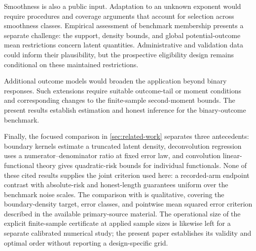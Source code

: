 Smoothness is also a public input. Adaptation to an unknown exponent would require procedures and coverage arguments that account for selection across smoothness classes. Empirical assessment of benchmark membership presents a separate challenge: the support, density bounds, and global potential-outcome mean restrictions concern latent quantities. Administrative and validation data could inform their plausibility, but the prospective eligibility design remains conditional on these maintained restrictions.

Additional outcome models would broaden the application beyond binary responses. Such extensions require suitable outcome-tail or moment conditions and corresponding changes to the finite-sample second-moment bounds. The present results establish estimation and honest inference for the binary-outcome benchmark.

Finally, the focused comparison in \cref{sec:related-work} separates three antecedents: boundary kernels estimate a truncated latent density, deconvolution regression uses a numerator--denominator ratio at fixed error law, and convolution linear-functional theory gives quadratic-risk bounds for individual functionals. None of these cited results supplies the joint criterion used here: a recorded-arm endpoint contrast with absolute-risk and honest-length guarantees uniform over the benchmark noise scales. The comparison with \citet{ZhangKarunamuni2009Boundary} is qualitative, covering the boundary-density target, error classes, and pointwise mean squared error criterion described in the available primary-source material. The operational size of the explicit finite-sample certificate at applied sample sizes is likewise left for a separate calibrated numerical study; the present paper establishes its validity and optimal order without reporting a design-specific grid.
